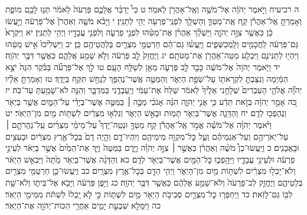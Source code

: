 \documentclass[twoside, openany, parskip=half, 11pt]{book}
\begin{document}
ה רביעיח וַיֹּ֣אמֶר יְהֹוָ֔ה אֶל־מֹשֶׁ֥ה וְאֶֽל־אַהֲרֹ֖ן לֵאמֹֽר׃ ט כִּי֩ יְדַבֵּ֨ר אֲלֵכֶ֤ם פַּרְעֹה֙ לֵאמֹ֔ר תְּנ֥וּ לָכֶ֖ם מוֹפֵ֑ת וְאָמַרְתָּ֣ אֶֽל־אַהֲרֹ֗ן קַ֧ח אֶֽת־מַטְּךָ֛ וְהַשְׁלֵ֥ךְ לִפְנֵֽי־פַרְעֹ֖ה יְהִ֥י לְתַנִּֽין׃ י וַיָּבֹ֨א מֹשֶׁ֤ה וְאַהֲרֹן֙ אֶל־פַּרְעֹ֔ה וַיַּ֣עֲשׂוּ כֵ֔ן כַּאֲשֶׁ֖ר צִוָּ֣ה יְהֹוָ֑ה וַיַּשְׁלֵ֨ךְ אַהֲרֹ֜ן אֶת־מַטֵּ֗הוּ לִפְנֵ֥י פַרְעֹ֛ה וְלִפְנֵ֥י עֲבָדָ֖יו וַיְהִ֥י לְתַנִּֽין׃ יא וַיִּקְרָא֙ גַּם־פַּרְעֹ֔ה לַֽחֲכָמִ֖ים וְלַֽמְכַשְּׁפִ֑ים וַיַּֽעֲשׂ֨וּ גַם־הֵ֜ם חַרְטֻמֵּ֥י מִצְרַ֛יִם בְּלַהֲטֵיהֶ֖ם כֵּֽן׃ יב וַיַּשְׁלִ֙יכוּ֙ אִ֣ישׁ מַטֵּ֔הוּ וַיִּהְי֖וּ לְתַנִּינִ֑ם וַיִּבְלַ֥ע מַטֵּֽה־אַהֲרֹ֖ן אֶת־מַטֹּתָֽם׃ יג וַיֶּחֱזַק֙ לֵ֣ב פַּרְעֹ֔ה וְלֹ֥א שָׁמַ֖ע אֲלֵהֶ֑ם כַּאֲשֶׁ֖ר דִּבֶּ֥ר יְהֹוָֽה׃
יד וַיֹּ֤אמֶר יְהֹוָה֙ אֶל־מֹשֶׁ֔ה כָּבֵ֖ד לֵ֣ב פַּרְעֹ֑ה מֵאֵ֖ן לְשַׁלַּ֥ח הָעָֽם׃ טו לֵ֣ךְ אֶל־פַּרְעֹ֞ה בַּבֹּ֗קֶר הִנֵּה֙ יֹצֵ֣א הַמַּ֔יְמָה וְנִצַּבְתָּ֥ לִקְרָאת֖וֹ עַל־שְׂפַ֣ת הַיְאֹ֑ר וְהַמַּטֶּ֛ה אֲשֶׁר־נֶהְפַּ֥ךְ לְנָחָ֖שׁ תִּקַּ֥ח בְּיָדֶֽךָ׃ טז וְאָמַרְתָּ֣ אֵלָ֗יו יְהֹוָ֞ה אֱלֹהֵ֤י הָעִבְרִים֙ שְׁלָחַ֤נִי אֵלֶ֙יךָ֙ לֵאמֹ֔ר שַׁלַּח֙ אֶת־עַמִּ֔י וְיַֽעַבְדֻ֖נִי בַּמִּדְבָּ֑ר וְהִנֵּ֥ה לֹא־שָׁמַ֖עְתָּ עַד־כֹּֽה׃ יז כֹּ֚ה אָמַ֣ר יְהֹוָ֔ה בְּזֹ֣את תֵּדַ֔ע כִּ֖י אֲנִ֣י יְהֹוָ֑ה הִנֵּ֨ה אָנֹכִ֜י מַכֶּ֣ה ׀ בַּמַּטֶּ֣ה אֲשֶׁר־בְּיָדִ֗י עַל־הַמַּ֛יִם אֲשֶׁ֥ר בַּיְאֹ֖ר וְנֶהֶפְכ֥וּ לְדָֽם׃ יח וְהַדָּגָ֧ה אֲשֶׁר־בַּיְאֹ֛ר תָּמ֖וּת וּבָאַ֣שׁ הַיְאֹ֑ר וְנִלְא֣וּ מִצְרַ֔יִם לִשְׁתּ֥וֹת מַ֖יִם מִן־הַיְאֹֽר׃
יט וַיֹּ֨אמֶר יְהֹוָ֜ה אֶל־מֹשֶׁ֗ה אֱמֹ֣ר אֶֽל־אַהֲרֹ֡ן קַ֣ח מַטְּךָ֣ וּנְטֵֽה־יָדְךָ֩ עַל־מֵימֵ֨י מִצְרַ֜יִם עַֽל־נַהֲרֹתָ֣ם ׀ עַל־יְאֹרֵיהֶ֣ם וְעַל־אַגְמֵיהֶ֗ם וְעַ֛ל כׇּל־מִקְוֵ֥ה מֵימֵיהֶ֖ם וְיִֽהְיוּ־דָ֑ם וְהָ֤יָה דָם֙ בְּכׇל־אֶ֣רֶץ מִצְרַ֔יִם וּבָעֵצִ֖ים וּבָאֲבָנִֽים׃ כ וַיַּֽעֲשׂוּ־כֵן֩ מֹשֶׁ֨ה וְאַהֲרֹ֜ן כַּאֲשֶׁ֣ר ׀ צִוָּ֣ה יְהֹוָ֗ה וַיָּ֤רֶם בַּמַּטֶּה֙ וַיַּ֤ךְ אֶת־הַמַּ֙יִם֙ אֲשֶׁ֣ר בַּיְאֹ֔ר לְעֵינֵ֣י פַרְעֹ֔ה וּלְעֵינֵ֖י עֲבָדָ֑יו וַיֵּהָ֥פְכ֛וּ כׇּל־הַמַּ֥יִם אֲשֶׁר־בַּיְאֹ֖ר לְדָֽם׃ כא וְהַדָּגָ֨ה אֲשֶׁר־בַּיְאֹ֥ר מֵ֙תָה֙ וַיִּבְאַ֣שׁ הַיְאֹ֔ר וְלֹא־יָכְל֣וּ מִצְרַ֔יִם לִשְׁתּ֥וֹת מַ֖יִם מִן־הַיְאֹ֑ר וַיְהִ֥י הַדָּ֖ם בְּכׇל־אֶ֥רֶץ מִצְרָֽיִם׃ כב וַיַּֽעֲשׂוּ־כֵ֛ן חַרְטֻמֵּ֥י מִצְרַ֖יִם בְּלָטֵיהֶ֑ם וַיֶּחֱזַ֤ק לֵב־פַּרְעֹה֙ וְלֹא־שָׁמַ֣ע אֲלֵהֶ֔ם כַּאֲשֶׁ֖ר דִּבֶּ֥ר יְהֹוָֽה׃ כג וַיִּ֣פֶן פַּרְעֹ֔ה וַיָּבֹ֖א אֶל־בֵּית֑וֹ וְלֹא־שָׁ֥ת לִבּ֖וֹ גַּם־לָזֹֽאת׃ כד וַיַּחְפְּר֧וּ כׇל־מִצְרַ֛יִם סְבִיבֹ֥ת הַיְאֹ֖ר מַ֣יִם לִשְׁתּ֑וֹת כִּ֣י לֹ֤א יָֽכְלוּ֙ לִשְׁתֹּ֔ת מִמֵּימֵ֖י הַיְאֹֽר׃ כה וַיִּמָּלֵ֖א שִׁבְעַ֣ת יָמִ֑ים אַחֲרֵ֥י הַכּוֹת־יְהֹוָ֖ה אֶת־הַיְאֹֽר׃
\end{document}
